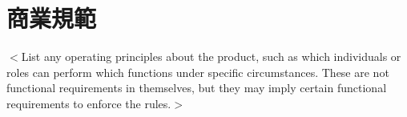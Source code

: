 \documentclass[12pt]{scrreprt}
\begin{document}
\section{商業規範}
$<$List any operating principles about the product, such as which individuals or 
roles can perform which functions under specific circumstances. These are not 
functional requirements in themselves, but they may imply certain functional 
requirements to enforce the rules.$>$


%
%
%
\end{document}
